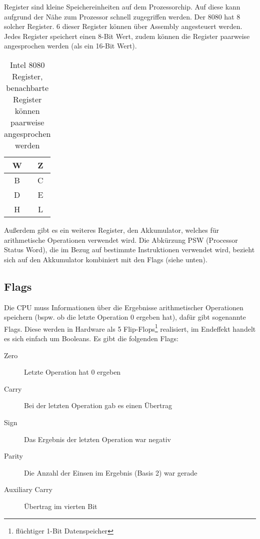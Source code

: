Register sind kleine Speichereinheiten auf dem Prozessorchip. Auf diese kann aufgrund der Nähe zum Prozessor schnell zugegriffen werden. Der 8080 hat 8 solcher Register.
6 dieser Register können über Assembly angesteuert werden. Jedes Register speichert einen 8-Bit Wert, zudem können die Register paarweise angesprochen werden (als ein 16-Bit Wert).

\begin{table}[h]
    \centering
    \caption{Intel 8080 Register, benachbarte Register können paarweise angesprochen werden}
    \label{tab:regs}
    \begin{tabular}{|c|c|}
        \hline
        W & Z \\\hline
        B & C \\\hline
        D & E \\\hline
        H & L \\\hline
    \end{tabular}
\end{table}

Außerdem gibt es ein weiteres Register, den Akkumulator, welches für arithmetische Operationen verwendet wird.
Die Abkürzung PSW (Processor Status Word), die im Bezug auf bestimmte Instruktionen verwendet wird, bezieht sich auf den Akkumulator kombiniert mit den Flags (siehe unten).

\subsection{Flags}\label{sec:flags}

Die CPU muss Informationen über die Ergebnisse arithmetischer Operationen speichern (bspw. ob die letzte Operation 0 ergeben hat), dafür gibt sogenannte Flags. Diese werden in Hardware als 5 Flip-Flops\footnote{flüchtiger 1-Bit Datenspeicher} realisiert, im Endeffekt handelt es sich einfach um Booleans. Es gibt die folgenden Flags:

\begin{description}
    \item[Zero] Letzte Operation hat 0 ergeben
    \item[Carry] Bei der letzten Operation gab es einen Übertrag
    \item[Sign] Das Ergebnis der letzten Operation war negativ
    \item[Parity] Die Anzahl der Einsen im Ergebnis (Basis 2) war gerade
    \item[Auxiliary Carry] Übertrag im vierten Bit %
\end{description}


